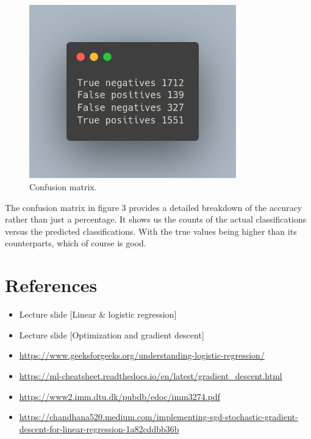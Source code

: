\documentclass{article}
\begin{document}
\bigskip

\begin{figure}[H]
    \centering
    \includegraphics[width=0.8\textwidth]{../imgs/carbon2.png} %
    \caption{Confusion matrix.}
\end{figure}

The confusion matrix in figure 3 provides a detailed breakdown of the accuracy
rather than just a percentage. It shows us the counts of the actual
classifications versus the predicted classifications. With the true values
being higher than its counterparts, which of course is good.

\section{References}
\begin{itemize}
    \item Lecture slide [Linear \& logistic regression]
    \item Lecture slide [Optimization and gradient descent]
    \item \url{https://www.geeksforgeeks.org/understanding-logistic-regression/}
    \item \url{https://ml-cheatsheet.readthedocs.io/en/latest/gradient_descent.html}
    \item \url{https://www2.imm.dtu.dk/pubdb/edoc/imm3274.pdf}
    \item \url{https://chandhana520.medium.com/implementing-sgd-stochastic-gradient-descent-for-linear-regression-1a82cddbb36b}
\end{itemize}
\end{document}
